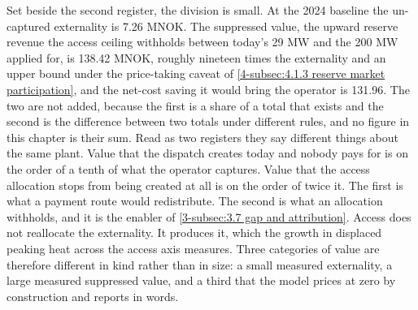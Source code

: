 Set beside the second register, the division is small. At the 2024 baseline the un-captured externality is 7.26 MNOK. The suppressed value, the upward reserve revenue the access ceiling withholds between today's 29 MW and the 200 MW applied for, is 138.42 MNOK, roughly nineteen times the externality and an upper bound under the price-taking caveat of \autoref{4-subsec:4.1.3 reserve market participation}, and the net-cost saving it would bring the operator is 131.96. The two are not added, because the first is a share of a total that exists and the second is the difference between two totals under different rules, and no figure in this chapter is their sum. Read as two registers they say different things about the same plant. Value that the dispatch creates today and nobody pays for is on the order of a tenth of what the operator captures. Value that the access allocation stops from being created at all is on the order of twice it. The first is what a payment route would redistribute. The second is what an allocation withholds, and it is the enabler of \autoref{3-subsec:3.7 gap and attribution}. Access does not reallocate the externality. It produces it, which the growth in displaced peaking heat across the access axis measures. Three categories of value are therefore different in kind rather than in size: a small measured externality, a large measured suppressed value, and a third that the model prices at zero by construction and reports in words.

